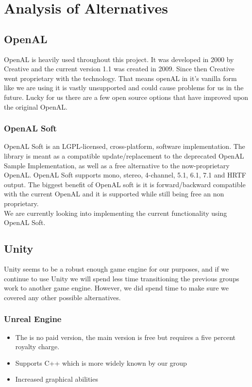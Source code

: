 \documentclass{scrreprt}
\begin{document}
\chapter{Analysis of Alternatives}
\section{OpenAL}
OpenAL is heavily used throughout this project. It was developed in 2000 by Creative and the current version 1.1 was created in 2009. Since then Creative went proprietary with the technology. That means openAL in it's vanilla form like we are using it is vastly unsupported and could cause problems for us in the future. Lucky for us there are a few open source options that have improved upon the original OpenAL.
\subsection{OpenAL Soft}
OpenAL Soft is an LGPL-licensed, cross-platform, software implementation. The library is meant as a compatible update/replacement to the deprecated OpenAL Sample Implementation, as well as a free alternative to the now-proprietary OpenAL. OpenAL Soft supports mono, stereo, 4-channel, 5.1, 6.1, 7.1 and HRTF output. The biggest benefit of OpenAL soft is it is forward/backward compatible with the current OpenAL and it is supported while still being free an non proprietary.\\
We are currently looking into implementing the current functionality using OpenAL Soft.

\section{Unity}
Unity seems to be a robust enough game engine for our purposes, and if we continue to use Unity we will spend less time transitioning the previous groups work to another game engine. However, we did spend time to make sure we covered any other possible alternatives.

\subsection{Unreal Engine}

\begin{itemize}
\item The is no paid version, the main version is free but requires a five percent royalty charge.
\item Supports C++ which is more widely known by our group
\item Increased graphical abilities
\end{itemize}
\end{document}
